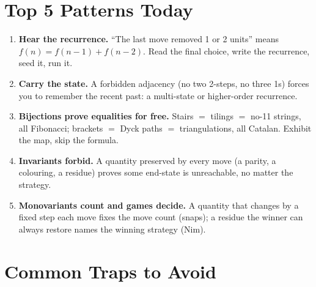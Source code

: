 \documentclass[11pt,a4paper]{article}
\begin{document}
\begin{enumerate}

\end{enumerate}

\section*{Top 5 Patterns Today}

\begin{enumerate}[leftmargin=2em, itemsep=4pt]
  \item \textbf{Hear the recurrence.} ``The last move removed 1 or 2 units'' means $f(n)=f(n-1)+f(n-2)$. Read the final choice, write the recurrence, seed it, run it. 
  \item \textbf{Carry the state.} A forbidden adjacency (no two 2-steps, no three 1s) forces you to remember the recent past: a multi-state or higher-order recurrence. 
  \item \textbf{Bijections prove equalities for free.} Stairs $=$ tilings $=$ no-11 strings, all Fibonacci; brackets $=$ Dyck paths $=$ triangulations, all Catalan. Exhibit the map, skip the formula. 
  \item \textbf{Invariants forbid.} A quantity preserved by every move (a parity, a colouring, a residue) proves some end-state is unreachable, no matter the strategy. 
  \item \textbf{Monovariants count and games decide.} A quantity that changes by a fixed step each move fixes the move count (snaps); a residue the winner can always restore names the winning strategy (Nim). 
\end{enumerate}

\section*{Common Traps to Avoid}
\end{document}
